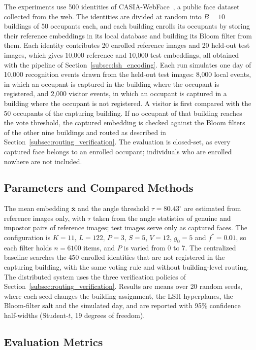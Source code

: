 \documentclass[pdflatex,sn-mathphys-num]{sn-jnl}%
\theoremstyle{thmstyleone}%
\theoremstyle{thmstyletwo}%
\theoremstyle{thmstylethree}%
\begin{document}
The experiments use 500 identities of CASIA-WebFace~\cite{yi2014}, a public face dataset collected from the web. The identities are divided at random into $B=10$ buildings of 50 occupants each, and each building enrolls its occupants by storing their reference embeddings in its local database and building its Bloom filter from them. Each identity contributes 20 enrolled reference images and 20 held-out test images, which gives 10,000 reference and 10,000 test embeddings, all obtained with the pipeline of Section~\ref{subsec:lsh_encoding}. Each run simulates one day of 10,000 recognition events drawn from the held-out test images: 8,000 local events, in which an occupant is captured in the building where the occupant is registered, and 2,000 visitor events, in which an occupant is captured in a building where the occupant is not registered. A visitor is first compared with the 50 occupants of the capturing building. If no occupant of that building reaches the vote threshold, the captured embedding is checked against the Bloom filters of the other nine buildings and routed as described in Section~\ref{subsec:routing_verification}. The evaluation is closed-set, as every captured face belongs to an enrolled occupant; individuals who are enrolled nowhere are not included.

\subsection{Parameters and Compared Methods}

The mean embedding $\bar{\mathbf{x}}$ and the angle threshold $\tau=80.43^{\circ}$ are estimated from reference images only, with $\tau$ taken from the angle statistics of genuine and impostor pairs of reference images; test images serve only as captured faces. The configuration is $K=11$, $L=122$, $P=3$, $S=5$, $V=12$, $g_0=5$ and $f^*=0.01$, so each filter holds $n=6100$ items, and $P$ is varied from 0 to 7. The centralized baseline searches the 450 enrolled identities that are not registered in the capturing building, with the same voting rule and without building-level routing. The distributed system uses the three verification policies of Section~\ref{subsec:routing_verification}. Results are means over 20 random seeds, where each seed changes the building assignment, the LSH hyperplanes, the Bloom-filter salt and the simulated day, and are reported with 95\% confidence half-widths (Student-$t$, 19 degrees of freedom).

\subsection{Evaluation Metrics}
\end{document}
